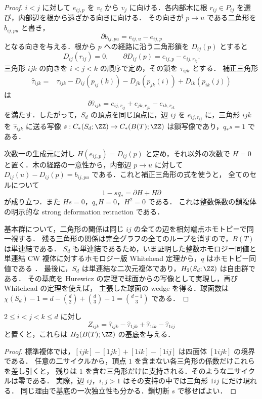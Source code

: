 \begin{proof}
$i<j$ に対して $e_{ij,p}$ を $v_i$ から $v_j$ に向ける．各内部木に根
$r_{ij}\in P_{ij}$ を選び，内部辺を根から遠ざかる向きに向ける．
その向きが $p\to u$ である二角形を $b_{ij,pu}$ と書き，
\[
 \partial b_{ij,pu}=e_{ij,u}-e_{ij,p}
\]
となる向きを与える．根から $p$ への経路に沿う二角形鎖を $D_{ij}(p)$ とすると
\[
 D_{ij}(r_{ij})=0,\qquad
 \partial D_{ij}(p)=e_{ij,p}-e_{ij,r_{ij}}.
\]
三角形 $ijk$ の向きを $i<j<k$ の順序で定め，その鎖を $\tau_{ijk}$ とする．
補正三角形
\begin{align*}
 \widehat\tau_{ijk}={}&\tau_{ijk}
   -D_{ij}(p_{ij}(k))-D_{jk}(p_{jk}(i))
   +D_{ik}(p_{ik}(j))
\end{align*}
は
\[
 \partial\widehat\tau_{ijk}
 =e_{ij,r_{ij}}+e_{jk,r_{jk}}-e_{ik,r_{ik}}
\]
を満たす．したがって，$S_d$ の頂点を同じ頂点に，辺 $ij$ を
$e_{ij,r_{ij}}$ に，三角形 $ijk$ を $\widehat\tau_{ijk}$ に送る写像
$s:C_*(S_d;\ZZ)\to C_*(B(T);\ZZ)$ は鎖写像であり，$q_*s=1$ である．

次数一の生成元に対し $H(e_{ij,p})=D_{ij}(p)$ と定め，それ以外の次数で
$H=0$ と置く．木の経路の一意性から，内部辺 $p\to u$ に対して
$D_{ij}(u)-D_{ij}(p)=b_{ij,pu}$ である．これと補正三角形の式を使うと，
全てのセルについて
\[
 1-sq_* =\partial H+H\partial
\]
が成り立つ．また $Hs=0$，$q_*H=0$，$H^2=0$ である．
これは整数係数の鎖複体の明示的な strong deformation retraction である．

基本群について，二角形の関係は同じ $ij$ の全ての辺を相対端点ホモトピーで同一視する．
残る三角形の関係は完全グラフの全てのループを消すので，$B(T)$ は単連結である．
$S_d$ も単連結であるため，いま証明した整数ホモロジー同値と
単連結 CW 複体に対するホモロジー版 Whitehead 定理から，$q$ はホモトピー同値である
\cite[Corollary 4.33]{Hatcher}．
最後に，$S_d$ は単連結な二次元複体であり，$H_2(S_d;\ZZ)$ は自由群である．
その基底を Hurewicz の定理で球面からの写像として実現し，再び Whitehead の定理を使えば，
主張した球面の wedge を得る．球面数は
$\chi(S_d)-1=d-\binom d2+\binom d3-1=\binom{d-1}{3}$ である．
\end{proof}

\begin{corollary}[整数二サイクルの基底]\label{topo:cycles}
$2\leq i<j<k\leq d$ に対し
\[
 Z_{ijk}=\widehat\tau_{ijk}-\widehat\tau_{1jk}
              +\widehat\tau_{1ik}-\widehat\tau_{1ij}
\]
と置くと，これらは $H_2(B(T);\ZZ)$ の基底を与える．
\end{corollary}

\begin{proof}
標準複体では，$[ijk]-[1jk]+[1ik]-[1ij]$ は四面体 $[1ijk]$ の境界である．
任意の二サイクルから，頂点 $1$ を含まない各三角形の係数だけこれらを差し引くと，
残りは $1$ を含む三角形だけに支持される．そのような二サイクルは零である．
実際，辺 $ij$，$i,j>1$ はその支持の中では三角形 $1ij$ にだけ現れる．
同じ理由で基底の一次独立性も分かる．鎖切断 $s$ で移せばよい．
\end{proof}

